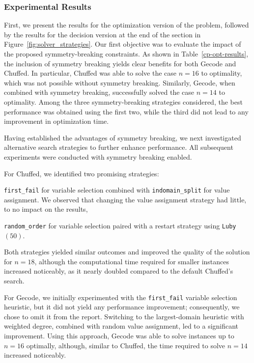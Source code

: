 \documentclass{article}
\begin{document}
\subsubsection{Experimental Results}

First, we present the results for the optimization version of the problem, followed by the results for the decision version at the end of the section in Figure~\ref{fig:solver_strategies}. Our first objective was to evaluate the impact of the proposed symmetry-breaking constraints. As shown in Table~\ref{cp-opt-results}, the inclusion of symmetry breaking yields clear benefits for both Gecode and Chuffed. In particular, Chuffed was able to solve the case $n=16$ to optimality, which was not possible without symmetry breaking. Similarly, Gecode, when combined with symmetry breaking, successfully solved the case $n=14$ to optimality. Among the three symmetry-breaking strategies considered, the best performance was obtained using the first two, while the third did not lead to any improvement in optimization time.

Having established the advantages of symmetry breaking, we next investigated alternative search strategies to further enhance performance. All subsequent experiments were conducted with symmetry breaking enabled.

For Chuffed, we identified two promising strategies:
\begin{enumerate*}[label=(\roman*)]
\item \texttt{first\_fail} for variable selection combined with \texttt{indomain\_split} for value assignment. We observed that changing the value assignment strategy had little, to no impact on the results,
\item \texttt{random\_order} for variable selection paired with a restart strategy using \texttt{Luby$(50)$}.
\end{enumerate*}
Both strategies yielded similar outcomes and improved the quality of the solution for $n=18$, although the computational time required for smaller instances increased noticeably, as it nearly doubled compared to the default Chuffed's search.

For Gecode, we initially experimented with the \texttt{first\_fail} variable selection heuristic, but it did not yield any performance improvement; consequently, we chose to omit it from the report. Switching to the largest-domain heuristic with weighted degree, combined with random value assignment, led to a significant improvement. Using this approach, Gecode was able to solve instances up to $n=16$ optimally, although, similar to Chuffed, the time required to solve $n=14$ increased noticeably.
\end{document}
